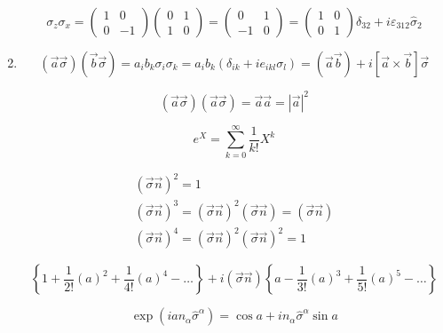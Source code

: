\begin{solution}
\begin{enumerate}
	$$
	\sigma_{z} \sigma_{x}=\left(\begin{array}{ll}{1} & {0} \\ {0} & {-1}\end{array}\right)\left(\begin{array}{ll}{0} & {1} \\ {1} & {0}\end{array}\right)=\left(\begin{array}{ll}{0} & {1} \\ {-1} & {0}\end{array}\right)=\left(\begin{array}{ll}{1} & {0} \\ {0} & {1}\end{array}\right) \delta_{32}+i \varepsilon_{312} \hat{\sigma}_{2}
	$$
	
	

\item 

$$
(\vec{a} \vec{\sigma})(\vec{b} \vec{\sigma})=a_{i} b_{k} \sigma_{i} \sigma_{k}=a_{i} b_{k}\left(\delta_{i k}+i e_{i k l} \sigma_{l}\right)=(\vec{a} \vec{b})+i[\vec{a} \times \vec{b}] \vec{\sigma}
$$

$$
(\vec{a} \vec{\sigma})(\vec{a} \vec{\sigma})=\vec{a} \vec{a}=|\vec{a}|^{2}
$$

$$
e^{X}=\sum_{k=0}^{\infty} \frac{1}{k !} X^{k}
$$

$$
\begin{array}{l}{(\vec{\sigma} \vec{n})^{2}=1} \\ {(\vec{\sigma} \vec{n})^{3}=(\vec{\sigma} \vec{n})^{2}(\vec{\sigma} \vec{n})=(\vec{\sigma} \vec{n})} \\ {(\vec{\sigma} \vec{n})^{4}=(\vec{\sigma} \vec{n})^{2}(\vec{\sigma} \vec{n})^{2}=1}\end{array}
$$

$$
\left\{1+\frac{1}{2 !}\left(a\right)^{2}+\frac{1}{4 !}\left(a\right)^{4}-\ldots\right\}+i(\vec{\sigma} \vec{n})\left\{a-\frac{1}{3 !}\left(a\right)^{3}+\frac{1}{5 !}\left(a\right)^{5}-\ldots\right\}
$$

$$
\exp \left(i a n_{\alpha} \hat{\sigma}^{\alpha}\right)=\cos a+i n_{\alpha} \hat{\sigma}^{\alpha} \sin a
$$

\end{enumerate}

\end{solution}



